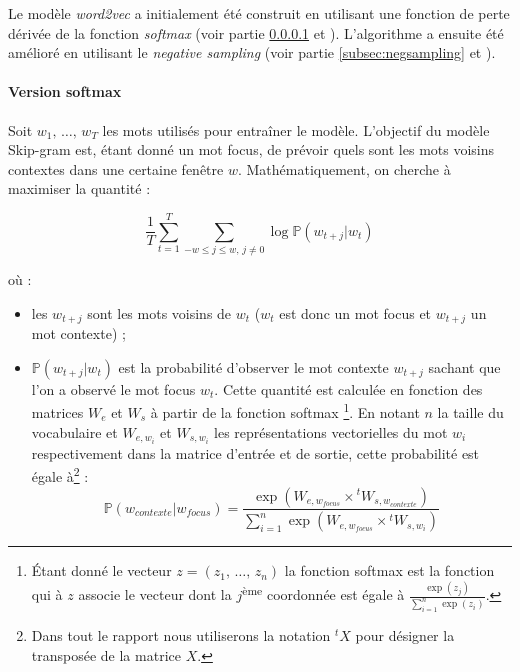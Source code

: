 \documentclass[11pt,french,french]{article}
\let\rmarkdownfootnote\footnote%
\def\footnote{\protect\rmarkdownfootnote}
\begin{document}
Le modèle \emph{word2vec} a initialement été construit en utilisant une
fonction de perte dérivée de la fonction \emph{softmax} (voir partie
\ref{subsec:softmax} et \cite{Mikolov}). L'algorithme a ensuite été
amélioré en utilisant le \emph{negative sampling} (voir partie
\ref{subsec:negsampling} et \cite{MikolovNS}).

\paragraph{Version softmax}\label{subsec:softmax}

Soit \(w_1,\,\dots,\,w_T\) les mots utilisés pour entraîner le modèle.
L'objectif du modèle Skip-gram est, étant donné un mot focus, de prévoir
quels sont les mots voisins contextes dans une certaine fenêtre \(w\).
Mathématiquement, on cherche à maximiser la quantité :

\begin{equation}
\frac 1 T\sum_{t=1}^T\sum_{-w\leq j \leq w,\,j\ne 0} \log \mathbb P(w_{t+j}\vert w_{t})
\label{eq:objSoftMax}
\end{equation}

où :

\begin{itemize}
\item
  les \(w_{t+j}\) sont les mots voisins de \(w_t\) (\(w_t\) est donc un
  mot focus et \(w_{t+j}\) un mot contexte) ;
\item
  \(\mathbb P(w_{t+j}\vert w_{t})\) est la probabilité d'observer le mot
  contexte \(w_{t+j}\) sachant que l'on a observé le mot focus \(w_t\).
  Cette quantité est calculée en fonction des matrices \(W_e\) et
  \(W_s\) à partir de la fonction softmax \footnote{Étant donné le
    vecteur \(z=(z_1,\,\dots,\,z_n)\) la fonction softmax est la
    fonction qui à \(z\) associe le vecteur dont la
    \(j\)\textsuperscript{ème} coordonnée est égale à
    \(\frac{\exp(z_j)}{\sum_{i=1}^n\exp(z_i)}\).}. En notant \(n\) la
  taille du vocabulaire et \(W_{e,w_i}\) et \(W_{s,w_i}\) les
  représentations vectorielles du mot \(w_i\) respectivement dans la
  matrice d'entrée et de sortie, cette probabilité est égale à\footnote{Dans
    tout le rapport nous utiliserons la notation \(^{t}X\) pour désigner
    la transposée de la matrice \(X\).} : \[
  \mathbb P(w_{contexte}\vert w_{focus}) = 
  \frac{
  \exp(W_{e,w_{focus}}\times {}^tW_{s,w_{contexte}})
  }{
  \sum_{i=1}^n\exp(W_{e,w_{focus}}\times {}^tW_{s,w_{i}})
  }
  \]
\end{itemize}
\end{document}
